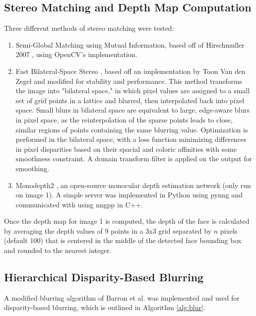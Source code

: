 \documentclass[10pt,twocolumn,letterpaper]{article}
\begin{document}
\subsection{Stereo Matching and Depth Map Computation}
Three different methods of stereo matching were tested:
\begin{enumerate}
    \item Semi-Global Matching using Mutual Information, based off of Hirschmuller 2007 \cite{hirschmuller_2007}, using OpenCV's implementation.
    \item Fast Bilateral-Space Stereo \cite{barron_adams_shih_hernandez_2015}, based off an implementation by Toon Van den Zegel \cite{fast_bilateral_stereo} and modified for stability and performance.
          This method transforms the image into "bilateral space," in which pixel values are assigned to a small set of grid points in a lattice and blurred, then interpolated back into pixel space.
          Small blurs in bilateral space are equivalent to large, edge-aware blurs in pixel space, as the reinterpolation of the sparse points leads to close, similar regions of points containing the
          same blurring value. Optimization is performed in the bilateral space, with a loss function minimizing differences in pixel disparities based on their spacial and coloric affinities with some
          smoothness constraint. A domain transform filter is applied on the output for smoothing.
    \item Monodepth2 \cite{monodepth2}, an open-source monocular depth estimation network (only run on image 1). A simple server was implemented in Python using pynng and communicated with using nngpp in C++.
\end{enumerate}

Once the depth map for image 1 is computed, the depth of the face is calculated by averaging the depth values of 9 points in a 3x3 grid separated by $n$ pixels (default 100) that is centered in the middle of the detected face bounding box and rounded to the nearest integer.

\subsection{Hierarchical Disparity-Based Blurring}

\par A modified blurring algorithm of Barron et al. \cite{barron_adams_shih_hernandez_2015} was implemented and used for disparity-based blurring, which is outlined in Algorithm \ref{alg:blur}.
\end{document}
